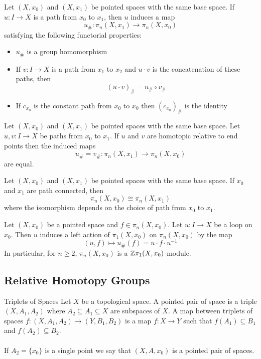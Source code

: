 \documentclass[a4paper]{article}
\begin{document}
\begin{thm}{}{} Let $(X,x_0)$ and $(X,x_1)$ be pointed spaces with the same base space. If $u:I\to X$ is a path from $x_0$ to $x_1$, then $u$ induces a map $$u_\#:\pi_n(X,x_1)\to\pi_n(X,x_0)$$ satisfying the following functorial properties: 
\begin{itemize}
\item $u_\#$ is a group homomorphism
\item If $v:I\to X$ is a path from $x_1$ to $x_2$ and $u\cdot v$ is the concatenation of these paths, then $$(u\cdot v)_\#=u_\#\circ v_\#$$
\item If $c_{x_0}$ is the constant path from $x_0$ to $x_0$ then $(c_{x_0})_\#$ is the identity
\end{itemize}
\end{thm}

\begin{prp}{}{} Let $(X,x_0)$ and $(X,x_1)$ be pointed spaces with the same base space. Let $u,v:I\to X$ be paths from $x_0$ to $x_1$. If $u$ and $v$ are homotopic relative to end points then the induced maps $$u_\#=v_\#:\pi_n(X,x_1)\to\pi_n(X,x_0)$$ are equal. 
\end{prp}

\begin{crl}{}{} Let $(X,x_0)$ and $(X,x_1)$ be pointed spaces with the same base space. If $x_0$ and $x_1$ are path connected, then $$\pi_n(X,x_0)\cong\pi_n(X,x_1)$$ where the isomorphism depends on the choice of path from $x_0$ to $x_1$. 
\end{crl}

\begin{prp}{}{} Let $(X,x_0)$ be a pointed space and $f\in\pi_n(X,x_0)$. Let $u:I\to X$ be a loop on $x_0$. Then $u$ induces a left action of $\pi_1(X,x_0)$ on $\pi_n(X,x_0)$ by the map $$(u,f)\mapsto u_\#(f)=u\cdot f\cdot u^{-1}$$ In particular, for $n\geq 2$, $\pi_n(X,x_0)$ is a $\mathbb{Z}\pi_1(X,x_0)$-module. 
\end{prp}

\subsection{Relative Homotopy Groups}
\begin{defn}{Triplets of Spaces}{} Let $X$ be a topological space. A pointed pair of space is a triple $(X,A_1,A_2)$ where $A_2\subseteq A_1\subseteq X$ are subspaces of $X$. A map between triplets of spaces $f:(X,A_1,A_2)\to(Y,B_1,B_2)$ is a map $f:X\to Y$ such that $f(A_1)\subseteq B_1$ and $f(A_2)\subseteq B_2$. \\~\\
If $A_2=\{x_0\}$ is a single point we say that $(X,A,x_0)$ is a pointed pair of spaces. 
\end{defn}
\end{document}
